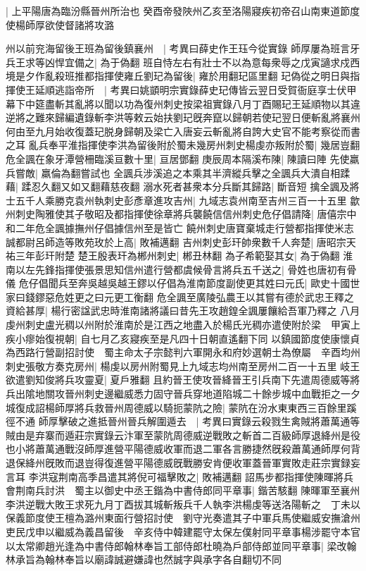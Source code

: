 |{
	上平陽唐為臨汾縣晉州所治也}
癸酉帝發陜州乙亥至洛陽寢疾初帝召山南東道節度使楊師厚欲使督諸將攻潞

州以前兖海留後王班為留後鎮襄州　|{
	考異曰薛史作王珏今從實錄}
師厚屢為班言牙兵王求等凶悍宜備之|{
	為于偽翻}
班自恃左右有壯士不以為意每衆辱之戊寅讁求戍西境是夕作亂殺班推都指揮使雍丘劉玘為留後|{
	雍於用翻玘區里翻}
玘偽從之明日與指揮使王延順逃詣帝所　|{
	考異曰姚顗明宗實錄薛史玘傳皆云翌日受賀衙庭享士伏甲幕下中筵盡斬其亂將以聞以功為復州刺史按梁祖實錄八月丁酉賜玘王延順物以其違逆將之難來歸編遺錄斬李洪等敕云始扶劉玘旣奔竄以歸朝若使玘翌日便斬亂將襄州何由至九月始收復蓋玘脱身歸朝及梁亡入唐妄云斬亂將自誇大史官不能考察從而書之耳}
亂兵奉平淮指揮使李洪為留後附於蜀未幾房州刺史楊虔亦叛附於蜀|{
	幾居豈翻}
危全諷在象牙潭營柵臨溪亘數十里|{
	亘居鄧翻}
庚辰周本隔溪布陳|{
	陳讀曰陣}
先使羸兵嘗敵|{
	羸倫為翻嘗試也}
全諷兵涉溪追之本乘其半濟縱兵擊之全諷兵大潰自相蹂藉|{
	蹂忍久翻又如又翻藉慈夜翻}
溺水死者甚衆本分兵斷其歸路|{
	斷音短}
擒全諷及將士五千人乘勝克袁州執刺史彭彥章進攻吉州|{
	九域志袁州南至吉州三百一十五里}
歙州刺史陶雅使其子敬昭及都指揮使徐章將兵襲饒信信州刺史危仔倡請降|{
	唐僖宗中和二年危全諷據撫州仔倡據信州至是皆亡}
饒州刺史唐寶棄城走行營都指揮使米志誠都尉呂師造等敗苑玫於上高|{
	敗補邁翻}
吉州刺史彭玕帥衆數千人奔楚|{
	唐昭宗天祐三年彭玕附楚}
楚王殷表玕為郴州刺史|{
	郴丑林翻}
為子希範娶其女|{
	為于偽翻}
淮南以左先鋒指揮使張景思知信州遣行營都虞候骨言將兵五千送之|{
	骨姓也唐初有骨儀}
危仔倡聞兵至奔吳越吳越王鏐以仔倡為淮南節度副使更其姓曰元氏|{
	歐史十國世家曰錢鏐惡危姓更之曰元更工衡翻}
危全諷至廣陵弘農王以其嘗有德於武忠王釋之資給甚厚|{
	楊行密諡武忠時淮南諸將議曰昔先王攻趙鍠全諷屢饟給吾軍乃釋之}
八月虔州刺史盧光稠以州附於淮南於是江西之地盡入於楊氏光稠亦遣使附於梁　甲寅上疾小瘳始復視朝|{
	自七月乙亥寢疾至是凡四十日朝直遙翻下同}
以鎮國節度使康懷貞為西路行營副招討使　蜀主命太子宗懿判六軍開永和府妙選朝士為僚屬　辛酉均州刺史張敬方奏克房州|{
	楊虔以房州附蜀見上九域志均州南至房州二百一十五里}
岐王欲遣劉知俊將兵攻靈夏|{
	夏戶雅翻}
且約晉王使攻晉絳晉王引兵南下先遣周德威等將兵出隂地關攻晉州刺史邊繼威悉力固守晉兵穿地道陷城二十餘步城中血戰拒之一夕城復成詔楊師厚將兵救晉州周德威以騎扼蒙阬之險|{
	蒙阬在汾水東東西三百餘里蹊徑不通}
師厚擊破之進抵晉州晉兵解圍遁去　|{
	考異曰實錄云殺戮生禽賊將蕭萬通等賊由是弃寨而遁莊宗實錄云汴軍至蒙阬周德威逆戰敗之斬首二百級師厚退絳州是役也小將蕭萬通戰沒師厚進營平陽德威收軍而退二軍各言勝捷然旣殺蕭萬通師厚何背退保絳州旣敗而退豈得復進營平陽德威旣戰勝安肯便收軍蓋晉軍實敗走莊宗實録妄言耳}
李洪寇荆南高季昌遣其將倪可福擊敗之|{
	敗補邁翻}
詔馬步都指揮使陳暉將兵會荆南兵討洪　蜀主以御史中丞王鍇為中書侍郎同平章事|{
	鍇苦駭翻}
陳暉軍至襄州李洪逆戰大敗王求死九月丁酉拔其城斬叛兵千人執李洪楊虔等送洛陽斬之　丁未以保義節度使王檀為潞州東面行營招討使　劉守光奏遣其子中軍兵馬使繼威安撫滄州吏民戊申以繼威為義昌留後　辛亥侍中韓建罷守太保左僕射同平章事楊涉罷守本官以太常卿趙光逢為中書侍郎翰林奉旨工部侍郎杜曉為戶部侍郎並同平章事|{
	梁改翰林承旨為翰林奉旨以廟諱誠避嫌諱也然誠字與承字各自翻切不同}
